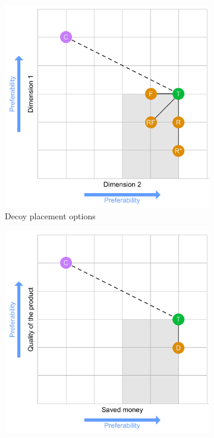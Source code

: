 \begin{figure}
	\begin{subfigure}[t]{0.49\textwidth}
		\includegraphics[width=\textwidth]{figures/decoy/decoy-dimensions-general}
		\caption{Decoy placement options \cite{Huber1982AsymetricallyDominated}}
	\end{subfigure}
	\begin{subfigure}[t]{0.49\textwidth}
		\includegraphics[width=\textwidth]{figures/decoy/decoy-dimensions-beer}

\end{subfigure}
\end{figure}
